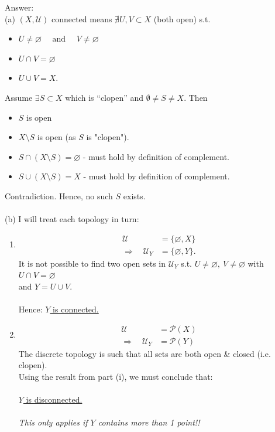 \documentclass[12pt]{article}
\begin{document}
\vspace{1cm}
\noindent
Answer:\\
(a) $(X,\mathcal{U})$ connected means $\nexists U,V\subset X$ (both open) s.t.
\begin{itemize}
\item $U\neq\varnothing\quad \text{ and } \quad V\neq\varnothing$
\item $U\cap V=\varnothing$
\item $U\cup V=X$.
\end{itemize}
Assume $\exists S\subset X$ which is ``clopen'' and $\emptyset \ne S \ne X$. Then
\begin{itemize}
\item $S$ is open
\item $X\setminus S$ is open (as $S$ is "clopen").
\item $S\cap(X\setminus S)=\varnothing$ - must hold by definition of complement.
\item $S\cup(X\setminus S)=X$ - must hold by definition of complement.
\end{itemize}
Contradiction. Hence, no such $S$ exists.\\
\\
(b) I will treat each topology in turn:
\begin{enumerate}
\item[(i)]
\begin{align*}
\mathcal{U} & = \{\varnothing,X\}\\
\Rightarrow\quad\mathcal{U}_Y &= \{\varnothing,Y\}.
\end{align*}
It is not possible to find two open sets in $\mathcal{U}_Y$ s.t. $U\neq\varnothing,\ V\neq \varnothing$ with $U\cap V=\varnothing$\\
and $Y=U\cup V$. \\
\\
Hence: \underline{$Y$ is connected.}

\newpage
\noindent
\item[(ii)]
\begin{align*}
\mathcal{U} &= \mathcal{P}(X)\\
\Rightarrow\quad\mathcal{U}_Y &= \mathcal{P}(Y)
\end{align*}
The discrete topology is such that all sets are both open \& closed (i.e. clopen).\\
Using the result from part (i), we must conclude that:\\
\\
\underline{$Y$ is disconnected.}\\
\\
\textit{This only applies if $Y$ contains more than 1 point!!}
\end{enumerate}
\end{document}
